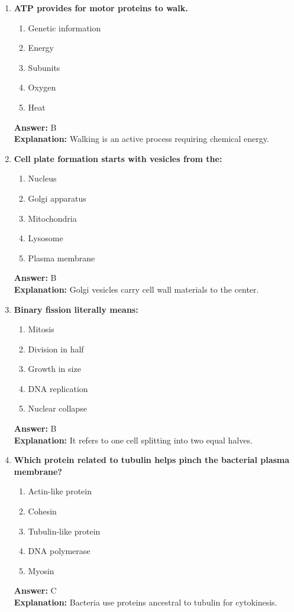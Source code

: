 \documentclass[11pt, a4paper]{article}
\begin{document}
\begin{enumerate}[leftmargin=*, label=\arabic*.]
\item \textbf{ATP provides \underline{\hspace{1cm}} for motor proteins to walk.}
\begin{enumerate}[label=\Alph*.]
\item Genetic information
\item Energy
\item Subunits
\item Oxygen
\item Heat
\end{enumerate}
\textbf{Answer:} B \\
\textbf{Explanation:} Walking is an active process requiring chemical energy.

\item \textbf{Cell plate formation starts with vesicles from the:}
\begin{enumerate}[label=\Alph*.]
\item Nucleus
\item Golgi apparatus
\item Mitochondria
\item Lysosome
\item Plasma membrane
\end{enumerate}
\textbf{Answer:} B \\
\textbf{Explanation:} Golgi vesicles carry cell wall materials to the center.

\item \textbf{Binary fission literally means:}
\begin{enumerate}[label=\Alph*.]
\item Mitosis
\item Division in half
\item Growth in size
\item DNA replication
\item Nuclear collapse
\end{enumerate}
\textbf{Answer:} B \\
\textbf{Explanation:} It refers to one cell splitting into two equal halves.

\item \textbf{Which protein related to tubulin helps pinch the bacterial plasma membrane?}
\begin{enumerate}[label=\Alph*.]
\item Actin-like protein
\item Cohesin
\item Tubulin-like protein
\item DNA polymerase
\item Myosin
\end{enumerate}
\textbf{Answer:} C \\
\textbf{Explanation:} Bacteria use proteins ancestral to tubulin for cytokinesis.


\end{enumerate}
\end{document}
